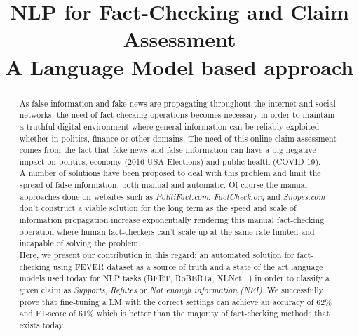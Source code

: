 \documentclass[conference]{IEEEtran}
\begin{document}
\title{NLP for Fact-Checking and Claim Assessment\\
{\Large A Language Model based approach}
}

\author{
\and
{}
}

\maketitle

\begin{abstract}
As false information and fake news are propagating throughout the internet and social networks, the need of fact-checking operations becomes necessary in order to maintain a truthful digital environment where general information can be reliably exploited whether in politics, finance or other domains. The need of this online claim assessment comes from the fact that fake news and false information can have a big negative impact on politics, economy (2016 USA Elections) and public health (COVID-19).\\ 
A number of solutions have been proposed to deal with this problem and limit the spread of false information, both manual and automatic. Of course the manual approaches done on websites such as \textit{PolitiFact.com}, \textit{FactCheck.org} and \textit{Snopes.com} don't construct a viable solution for the long term as the speed and scale of information propagation increase exponentially rendering this manual fact-checking operation where human fact-checkers can't scale up at the same rate limited and incapable of solving the problem.\\
Here, we present our contribution in this regard: an automated solution for fact-checking using FEVER dataset as a source of truth and a state of the art language models used today for NLP tasks (BERT, RoBERTa, XLNet...) in order to classify a given claim as \textit{Supports}, \textit{Refutes} or \textit{Not enough information (NEI)}. We successfully prove that fine-tuning a LM with the correct settings can achieve an accuracy of 62\% and F1-score of 61\% which is better than the majority of fact-checking methods that exists today.\\
\end{abstract}
\end{document}
